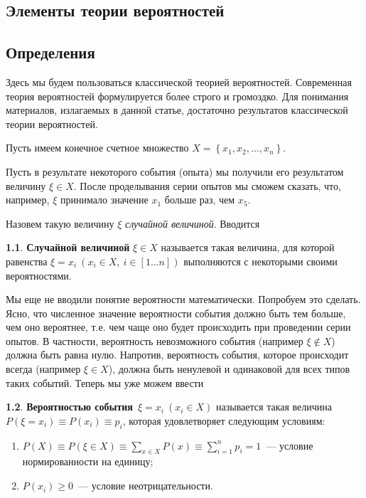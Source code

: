 \documentclass[12pt,a4paper,openright]{book}
\theoremstyle{definition}
\newtheorem{definition}{\textls[150]{Определение}}[chapter]
\numberwithin{equation}{chapter}
\begin{document}
	\begin{appendices}

		\chapter{Элементы теории вероятностей}

		\section{Определения}

		Здесь мы будем пользоваться классической теорией вероятностей. Современная теория вероятностей формулируется более строго и громоздко. Для понимания материалов, излагаемых в данной статье, достаточно результатов классической теории вероятностей.

		Пусть имеем конечное счетное множество $X = \left\{x_1,x_2,\dots,x_n\right\}$.

		Пусть в результате некоторого события (опыта) мы получили его результатом величину $\xi \in X$. После проделывания серии опытов мы сможем сказать, что, например, $\xi$ принимало значение $x_1$ больше раз, чем $x_5$.

		Назовем такую величину $\xi$ \textit{случайной величиной}. Вводится
		\begin{definition}
			\textbf{Случайной величиной} $\xi \in X$ называется такая величина, для которой равенства $\xi = x_i \ \left(x_i \in X, \ i \in \left[1 \dots n\right]\right)$ выполняются с некоторыми своими вероятностями.
		\end{definition}

		Мы еще не вводили понятие вероятности математически. Попробуем это сделать. Ясно, что численное значение вероятности события должно быть тем больше, чем оно вероятнее, т.е. чем чаще оно будет происходить при проведении серии опытов. В частности, вероятность невозможного события (например $\xi \not\in X$) должна быть равна нулю. Напротив, вероятность события, которое происходит всегда (например $\xi \in X$), должна быть ненулевой и одинаковой для всех типов таких событий. Теперь мы уже можем ввести
		\begin{definition}
			\textbf{Вероятностью события}\footnotemark\ $\xi=x_i \ \left(x_i \in X\right)$ называется такая величина $P(\xi=x_i) \equiv P(x_i) \equiv p_i$, которая удовлетворяет следующим условиям:
			\begin{enumerate}
				\item $P(X) \equiv P(\xi \in X) \equiv \sum\limits_{x \in X} P(x) \equiv \sum\limits_{i = 1}^n p_i = 1$~--- условие нормированности на единицу;
				\item $P(x_i) \ge 0$~--- условие неотрицательности.
			\end{enumerate}
		\end{definition}


\end{appendices}
\end{document}
